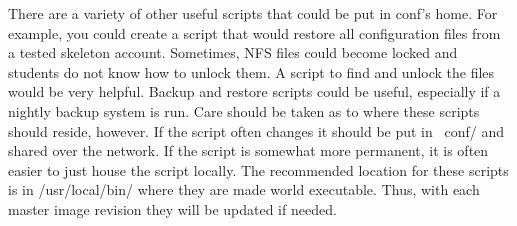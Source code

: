 There are a variety of other useful scripts that could be put in conf's home.  For example, you could create a script that would restore all configuration files from a tested skeleton account.  Sometimes, NFS files could become locked and students do not know how to unlock them.  A script to find and unlock the files would be very helpful.  Backup and restore scripts could be useful, especially if a nightly backup system is run.  Care should be taken as to where these scripts should reside, however.  If the script often changes it should be put in ~conf/ and shared over the network.  If the script is somewhat more permanent, it is often easier to just house the script locally.  The recommended location for these scripts is in /usr/local/bin/ where they are made world executable.  Thus, with each master image revision they will be updated if needed.  




